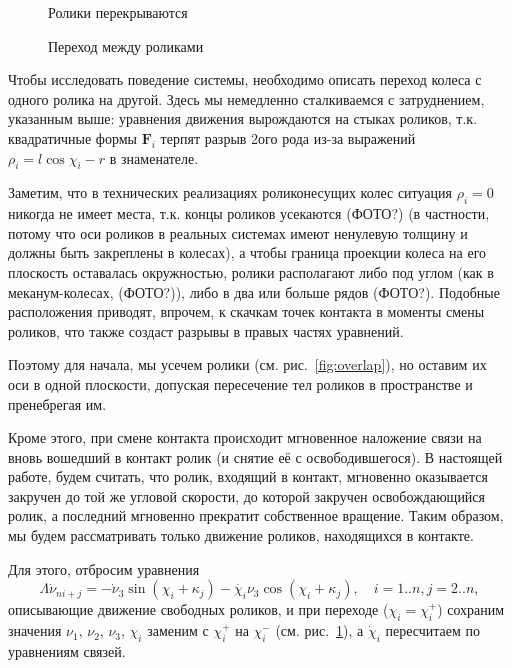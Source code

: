 \begin{figure}
        \centering
        \caption{Ролики перекрываются}
        \label{fig:overlap}
    \endminipage
        \centering
        \caption{Переход между роликами}
        \label{fig:change}
    \endminipage
\end{figure}

Чтобы исследовать поведение системы, необходимо описать переход колеса с одного ролика на другой. Здесь мы немедленно сталкиваемся с затруднением, указанным выше: уравнения движения вырождаются на стыках роликов, т.к. квадратичные формы $\boldsymbol{F}_i$ терпят разрыв 2ого рода из-за выражений $\rho_i = l\cos\chi_i-r$ в знаменателе.

Заметим, что в технических реализациях роликонесущих колес ситуация $\rho_i = 0$ никогда не имеет места, т.к. концы роликов усекаются (ФОТО?) (в частности, потому что оси роликов в реальных системах имеют ненулевую толщину и должны быть закреплены в колесах), а чтобы граница проекции колеса на его плоскость оставалась окружностью, ролики располагают либо под углом (как в меканум-колесах, (ФОТО?)), либо в два или больше рядов (ФОТО?). Подобные расположения приводят, впрочем, к скачкам точек контакта в моменты смены роликов, что также создаст разрывы в правых частях уравнений.

Поэтому для начала, мы усечем ролики (см. рис.~\ref{fig:overlap}), но оставим их оси в одной плоскости, допуская пересечение тел роликов в пространстве и пренебрегая им.

Кроме этого, при смене контакта происходит мгновенное наложение связи на вновь вошедший в контакт ролик (и снятие её с освободившегося). В настоящей работе, будем считать, что ролик, входящий в контакт, мгновенно оказывается закручен до той же угловой скорости, до которой закручен освобождающийся ролик, а последний мгновенно прекратит собственное вращение. Таким образом, мы будем рассматривать только движение роликов, находящихся в контакте.

Для этого, отбросим уравнения
$$
\Lambda\dot{\nu}_{ni+j} = -\dot{\nu}_3\sin(\chi_i+\kappa_j) - \dot{\chi_i}\nu_3\cos(\chi_i+\kappa_j), \quad i = 1..n, j = 2..n,
$$
описывающие движение свободных роликов, и при переходе ($\chi_i = \chi_i^+$) сохраним значения $\nu_1$, $\nu_2$, 
$\nu_3$, $\chi_i$ заменим с $\chi_i^+$ на $\chi_i^-$ (см. рис.~\ref{fig:change}), а $\dot\chi_i$ пересчитаем по уравнениям связей.

